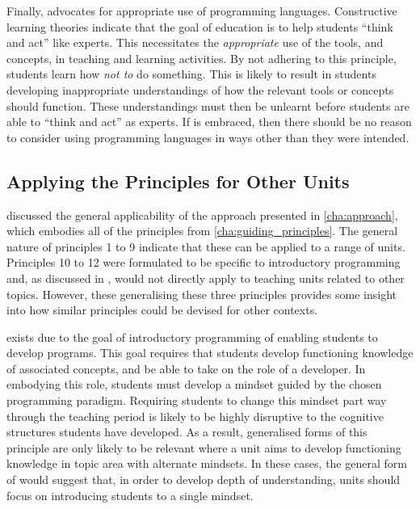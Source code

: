 Finally,  advocates for appropriate use of programming languages. Constructive learning theories indicate that the goal of education is to help students ``think and act'' like experts. This necessitates the \emph{appropriate} use of the tools, and concepts, in teaching and learning activities. By not adhering to this principle, students learn how \emph{not to} do something. This is likely to result in students developing inappropriate understandings of how the relevant tools or concepts should function. These understandings must then be unlearnt before students are able to ``think and act'' as experts. If  is embraced, then there should be no reason to consider using programming languages in ways other than they were intended.


\subsection{Applying the Principles for Other Units} %
\label{sub:applying_the_principles_for_other_units}

 discussed the general applicability of the approach presented in \cref{cha:approach}, which embodies all of the principles from \cref{cha:guiding_principles}. The general nature of principles 1 to 9 indicate that these can be applied to a range of units. Principles 10 to 12 were formulated to be specific to introductory programming and, as discussed in , would not directly apply to teaching units related to other topics. However, these generalising these three principles provides some insight into how similar principles could be devised for other contexts.

 exists due to the goal of introductory programming of enabling students to develop programs. This goal requires that students develop functioning knowledge of associated concepts, and be able to take on the role of a developer. In embodying this role, students must develop a mindset guided by the chosen programming paradigm. Requiring students to change this mindset part way through the teaching period is likely to be highly disruptive to the cognitive structures students have developed. As a result, generalised forms of this principle are only likely to be relevant where a unit aims to develop functioning knowledge in topic area with alternate mindsets. In these cases, the general form of  would suggest that, in order to develop depth of understanding, units should focus on introducing students to a single mindset.

